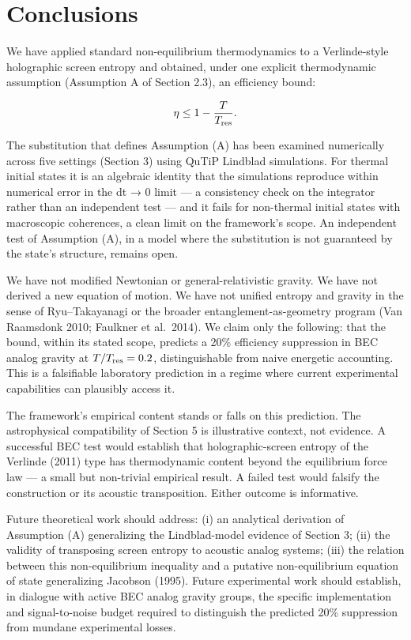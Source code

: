 \documentclass[11pt]{article}
\begin{document}
\section{Conclusions}\label{conclusions}

We have applied standard non-equilibrium thermodynamics to a Verlinde-style holographic screen entropy and obtained, under one explicit thermodynamic assumption (Assumption A of Section 2.3), an efficiency bound:

\[\eta \leq 1 - \frac{T}{T_{\rm res}}.\]

The substitution that defines Assumption (A) has been examined numerically across five settings (Section 3) using QuTiP Lindblad simulations. For thermal initial states it is an algebraic identity that the simulations reproduce within numerical error in the dt → 0 limit --- a consistency check on the integrator rather than an independent test --- and it fails for non-thermal initial states with macroscopic coherences, a clean limit on the framework's scope. An independent test of Assumption (A), in a model where the substitution is not guaranteed by the state's structure, remains open.

We have not modified Newtonian or general-relativistic gravity. We have not derived a new equation of motion. We have not unified entropy and gravity in the sense of Ryu--Takayanagi or the broader entanglement-as-geometry program (Van Raamsdonk 2010; Faulkner et al.~2014). We claim only the following: that the bound, within its stated scope, predicts a 20\% efficiency suppression in BEC analog gravity at \(T/T_{\rm res} = 0.2\), distinguishable from naive energetic accounting. This is a falsifiable laboratory prediction in a regime where current experimental capabilities can plausibly access it.

The framework's empirical content stands or falls on this prediction. The astrophysical compatibility of Section 5 is illustrative context, not evidence. A successful BEC test would establish that holographic-screen entropy of the Verlinde (2011) type has thermodynamic content beyond the equilibrium force law --- a small but non-trivial empirical result. A failed test would falsify the construction or its acoustic transposition. Either outcome is informative.

Future theoretical work should address: (i) an analytical derivation of Assumption (A) generalizing the Lindblad-model evidence of Section 3; (ii) the validity of transposing screen entropy to acoustic analog systems; (iii) the relation between this non-equilibrium inequality and a putative non-equilibrium equation of state generalizing Jacobson (1995). Future experimental work should establish, in dialogue with active BEC analog gravity groups, the specific implementation and signal-to-noise budget required to distinguish the predicted 20\% suppression from mundane experimental losses.
\end{document}
